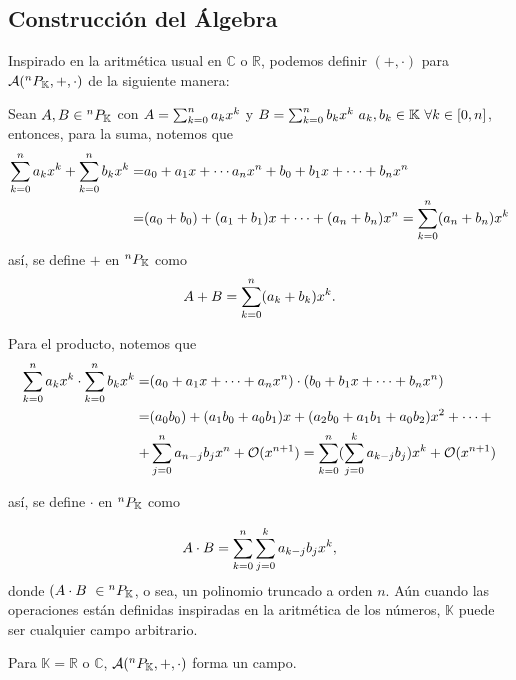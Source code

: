 \subsection{Construcción del Álgebra}
\label{sec:alg_field}

Inspirado en la aritmética usual en $\mathbb{C}$ o $\mathbb{R}$, podemos definir $(+,\cdot)$ para $\mathcal{A}(^{n}P_{\mathbb{K}},+,\cdot)$ de la siguiente manera:

Sean $A,B \in {^{n}P_{\mathbb{K}}}$ con $A = \sum_{k=0}^n a_k x^k$ y $B = \sum_{k=0}^n b_k x^k \ a_k,b_k \in \mathbb{K} \ \forall k \in [0,n]$, entonces, para la suma, notemos que
\begin{align*}
\sum_{k=0}^n a_k x^k + \sum_{k=0}^n b_k x^k =& a_0 + a_1 x + \cdots a_n x^n + b_0 + b_1 x + \cdots + b_n x^n \\
=& (a_0 + b_0) + (a_1 + b_1) x + \cdots + (a_n + b_n)x^n = \sum_{k=0}^n (a_n + b_n) x^k 
\end{align*}
así, se define \textbf{$+$}  en ${^{n}P_{\mathbb{K}}}$ como
\begin{equation}
A + B = \sum_{k=0}^n (a_k + b_k) x^k.
\label{eq:polsum}
\end{equation}

Para el producto, notemos que
\begin{align*}
\sum_{k=0}^n a_k x^k\cdot\sum_{k=0}^n b_k x^k =& (a_0 + a_1 x + \cdots + a_n x^n)\cdot(b_0 + b_1 x + \cdots + b_n x^n) \\
=& (a_0b_0) + (a_1b_0 + a_0b_1) x + (a_2b_0 + a_1b_1 + a_0b_2) x^2 + \cdots + \\
+& \sum_{j=0}^n a_{n-j}b_j x^n + \mathcal{O}(x^{n+1}) = \sum_{k=0}^n  (\sum_{j=0}^k a_{k-j}b_j  )  x^k + \mathcal{O}(x^{n+1})
\end{align*}

así, se define \textbf{$\cdot$}  en ${^{n}P_{\mathbb{K}}}$ como

\begin{equation}
A \cdot B = \sum_{k=0}^n \sum_{j=0}^k a_{k-j}b_j x^k,
\label{eq:polprod}
\end{equation}
donde $( A \cdot B \ \in {^{n}P_{\mathbb{K}}}$, o sea, un polinomio truncado a orden $n$. Aún cuando las operaciones están definidas inspiradas en la aritmética de los números, $\mathbb{K}$ puede ser cualquier campo arbitrario.

\begin{proposicion}
Para $\mathbb{K} = \mathbb{R}$ o $\mathbb{C}$, $\mathcal{A}(^{n}P_{\mathbb{K}},+,\cdot)$ forma un campo.
\label{prop:alg_field}
\end{proposicion}

